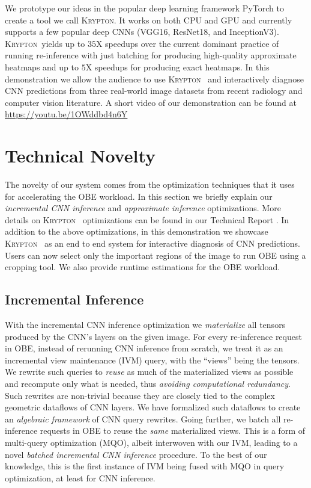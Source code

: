 \documentclass{vldb}
\newcommand{\system}{\textsc{Krypton}}
\begin{document}
We prototype our ideas in the popular deep learning framework PyTorch to create a tool we call \system. It works on both CPU and GPU and currently supports a few popular deep CNNs (VGG16, ResNet18, and InceptionV3).
\system ~yields up to $35$X speedups over the current dominant practice of running re-inference with just batching for producing high-quality approximate heatmaps and up to $5$X speedups for producing exact heatmaps.
In this demonstration we allow the audience to use \system~ and interactively diagnose CNN predictions from three real-world image datasets from recent radiology and computer vision literature.
A short video of our demonstration can be found at \url{https://youtu.be/1OWddbd4n6Y}

\section{Technical Novelty}
The novelty of our system comes from the optimization techniques that it uses for accelerating the OBE workload.
In this section we briefly explain our \textit{incremental CNN inference} and \textit{approximate inference} optimizations.
More details on \system~ optimizations can be found in our Technical Report \cite{krypton}.
In addition to the above optimizations, in this demonstration we showcase \system~ as an end to end system for interactive diagnosis of CNN predictions.
Users can now select only the important regions of the image to run OBE using a cropping tool.
We also provide runtime estimations for the OBE workload. 


\subsection{Incremental Inference}
With the incremental CNN inference optimization we \textit{materialize} all tensors produced by the CNN's layers on the given image. For every re-inference request in OBE, instead of rerunning CNN inference from scratch, we treat it as an incremental view maintenance (IVM) query, with the ``views'' being the tensors. We rewrite such queries to \textit{reuse} as much of the materialized views as possible and recompute only what is needed, thus \textit{avoiding computational redundancy}. Such rewrites are non-trivial because they are closely tied to the complex geometric dataflows of CNN layers. We have formalized such dataflows to create an \textit{algebraic framework} of CNN query rewrites. Going further, we batch all re-inference requests in OBE to reuse the \textit{same} materialized views. This is a form of multi-query optimization (MQO), albeit interwoven with our IVM, leading to a novel \textit{batched incremental CNN inference} procedure. To the best of our knowledge, this is the first instance of IVM being fused with MQO in query optimization, at least for CNN inference.
\end{document}
